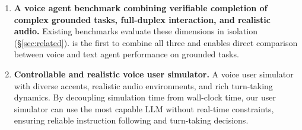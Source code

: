 \begin{enumerate}
    \item \textbf{A voice agent benchmark combining verifiable completion of complex grounded tasks, full-duplex interaction, and realistic audio.} Existing benchmarks evaluate these dimensions in isolation (\S\ref{sec:related}). \tauvoice{} is the first to combine all three and enables direct comparison between voice and text agent performance on grounded tasks.
    
    \item \textbf{Controllable and realistic voice user simulator.} A voice user simulator with diverse accents, realistic audio environments, and rich turn-taking dynamics. By decoupling simulation time from wall-clock time, our user simulator can use the most capable LLM without real-time constraints, ensuring reliable instruction following and turn-taking decisions.
    

\end{enumerate}
